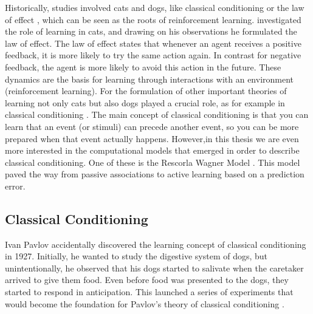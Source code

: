 Historically, studies involved cats and dogs, like classical conditioning \citep{pavlov1927conditional} or the law of effect \citep{thorndike1927law}, which can be seen as the roots of reinforcement learning. 
\citet{thorndike1927law} investigated the role of learning in cats, and drawing on his observations he formulated the law of effect.
The law of effect states that whenever an agent receives a positive feedback, it is more likely to try the same action again. In contrast for negative feedback, the agent is more likely to avoid this action in the future.
These dynamics are the basis for learning through interactions with an environment (reinforcement learning).%
For the formulation of other important theories of learning not only cats but also dogs played a crucial role, as for example in classical conditioning \citep{pavlov1927conditional}. 
The main concept of classical conditioning is that you can learn that an event (or stimuli) can precede another event, so you can be more prepared when that event actually happens. However,in this thesis we are even more interested in the computational models that emerged in order to describe classical conditioning. One of these is the Rescorla Wagner Model \citep{rescorla1972theory}. This model paved the way from passive associations to active learning based on a prediction error.

\subsection{Classical Conditioning}
Ivan Pavlov accidentally discovered the learning concept of classical conditioning in 1927. Initially, he wanted to study the digestive system of dogs, but unintentionally, he observed that his dogs started to salivate when the caretaker arrived to give them food. Even before food was presented to the dogs, they started to respond in anticipation. This launched a series of experiments that would become the foundation for Pavlov's theory of classical conditioning \citep{pavlov1927conditional}.  

